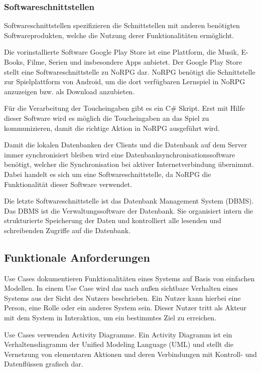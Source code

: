 		\subsubsection{Softwareschnittstellen}
			Softwareschnittstellen spezifizieren die Schnittstellen mit anderen benötigten Softwareprodukten, welche die Nutzung derer Funktionalitäten ermöglicht.
			
			Die vorinstallierte Software Google Play Store ist eine Plattform, die Musik, E-Books, Filme, Serien und insbesondere Apps anbietet. Der Google Play Store stellt eine Softwareschnittstelle zu NoRPG dar. NoRPG benötigt die Schnittstelle zur Spielplattform von Android, um die dort verfügbaren Lernspiel in NoRPG anzuzeigen bzw. als Download anzubieten.
			
			Für die Verarbeitung der Toucheingaben gibt es ein C\# Skript. Erst mit Hilfe dieser Software wird es möglich die Toucheingaben an das Spiel zu kommunizieren, damit die richtige Aktion in NoRPG ausgeführt wird.
			
			Damit die lokalen Datenbanken der Clients und die Datenbank auf dem Server immer synchronisiert bleiben wird eine Datenbanksynchronisationssoftware benötigt, welcher die Synchronisation bei aktiver Internetverbindung übernimmt. Dabei handelt es sich um eine Softwareschnittstelle, da NoRPG die Funktionalität dieser Software verwendet.
			
			Die letzte Softwareschnittstelle ist das Datenbank Management System (DBMS). Das DBMS ist die Verwaltungssoftware der Datenbank. Sie organisiert intern die strukturierte Speicherung der Daten und kontrolliert alle lesenden und schreibenden Zugriffe auf die Datenbank.

	\subsection{Funktionale Anforderungen}
		Use Cases dokumentieren Funktionalitäten eines Systems auf Basis von einfachen Modellen. In einem Use Case wird das nach außen sichtbare Verhalten eines Systems aus der Sicht des Nutzers beschrieben. Ein Nutzer kann hierbei eine Person, eine Rolle oder ein anderes System sein. Dieser Nutzer tritt als Akteur mit dem System in Interaktion, um ein bestimmtes Ziel zu erreichen. %
		
		Use Cases verwenden Activity Diagramme. Ein Activity Diagramm ist ein Verhaltensdiagramm der Unified Modeling Language (UML) und stellt die Vernetzung von elementaren Aktionen und deren Verbindungen mit Kontroll- und Datenflüssen grafisch dar.
	
